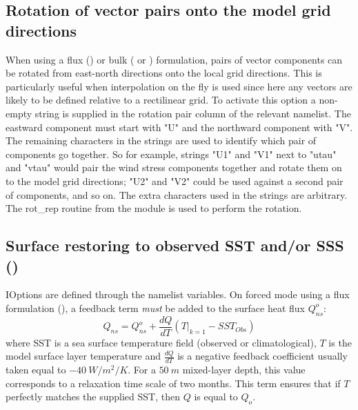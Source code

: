 \documentclass[../main/NEMO_manual]{subfiles}
\begin{document}
\subsection{Rotation of vector pairs onto the model grid directions}
\label{subsec:SBC_rotation}

When using a flux () or
bulk ( or ) formulation,
pairs of vector components can be rotated from east-north directions onto the local grid directions.
This is particularly useful when interpolation on the fly is used since here any vectors are likely to
be defined relative to a rectilinear grid.
To activate this option a non-empty string is supplied in the rotation pair column of the relevant namelist.
The eastward component must start with "U" and the northward component with "V".  
The remaining characters in the strings are used to identify which pair of components go together.
So for example, strings "U1" and "V1" next to "utau" and "vtau" would pair the wind stress components together and
rotate them on to the model grid directions;
"U2" and "V2" could be used against a second pair of components, and so on.
The extra characters used in the strings are arbitrary.
The rot\_rep routine from the  module is used to perform the rotation.

\subsection{Surface restoring to observed SST and/or SSS (\protect{})}
\label{subsec:SBC_ssr}


IOptions are defined through the  namelist variables.
On forced mode using a flux formulation (),
a feedback term \emph{must} be added to the surface heat flux $Q_{ns}^o$:
\[
  Q_{ns} = Q_{ns}^o + \frac{dQ}{dT} \left( \left. T \right|_{k=1} - SST_{Obs} \right)
\]
where SST is a sea surface temperature field (observed or climatological),
$T$ is the model surface layer temperature and
$\frac{dQ}{dT}$ is a negative feedback coefficient usually taken equal to $-40~W/m^2/K$.
For a $50~m$ mixed-layer depth, this value corresponds to a relaxation time scale of two months. 
This term ensures that if $T$ perfectly matches the supplied SST, then $Q$ is equal to $Q_o$. 
\end{document}
